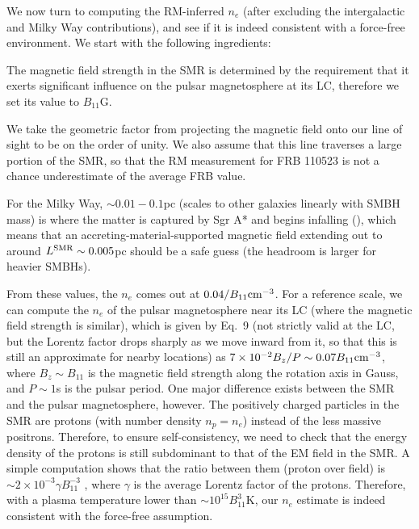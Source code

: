 \documentclass{aa}
\begin{document}
We now turn to computing the RM-inferred $n_e$ (after excluding the intergalactic and Milky Way contributions), and see if it is indeed consistent with a force-free environment. We start with the following ingredients:
\begin{list}{}{\leftmargin=1em}\renewcommand{\labelenumi}{\textbf{\theenumi}.}
\setlength{\leftmargin}{0pt}

\item 
The magnetic field strength in the SMR is determined by the requirement that it exerts significant influence on the pulsar magnetosphere at its LC, therefore we set its value to $B_{11}$G. 

\item We take the geometric factor from projecting the magnetic field onto our line of sight to be on the order of unity.
We also assume that this line traverses a large portion of the SMR, so that the RM measurement for FRB 110523 is not a chance underestimate of the average FRB value. 

\item For the Milky Way, $\sim 0.01-0.1$pc (scales to other galaxies linearly with SMBH mass) is where the matter is captured by Sgr A* and begins infalling (\cite{2013pss5.book..243M,1994ApJ...426..577M,2002ApJ...575..855Q}), which means that an accreting-material-supported magnetic field extending out to around $L^{\rm SMR} \sim 0.005$pc should be a safe guess (the headroom is larger for heavier SMBHs). 
\end{list}
From these values, the $n_e$ comes out at $0.04/B_{11} {\rm cm}^{-3}$. For a reference scale, we can compute the $n_e$ of the pulsar magnetosphere near its LC (where the magnetic field strength is similar), which is given by 
\cite{Goldreich:1969sb} Eq.~9 (not strictly valid at the LC, but the Lorentz factor drops sharply as we move inward from it, so that this is still an approximate for nearby locations) as
$7\times 10^{-2} B_z/P \sim 0.07 B_{11} \rm{cm}^{-3}$, where $B_z \sim B_{11}$ is the magnetic field strength along the rotation axis in Gauss, and $P\sim 1$s is the pulsar period. 
One major difference exists between the SMR and the pulsar magnetosphere,
however. The positively charged particles in the SMR are protons (with number density $n_p=n_e$) instead of the less massive positrons. Therefore, to ensure self-consistency, we need to check that the energy density of the protons is still subdominant to that of the EM field in the SMR. A simple computation shows that the ratio between them (proton over field) is $\sim 2\times 10^{-3}\gamma B_{11}^{-3}$ , where $\gamma$ is the average Lorentz factor of the protons. Therefore, with a plasma temperature lower than $\sim 10^{15}B^3_{11}$K, our $n_e$ estimate is indeed consistent with the force-free assumption.
\end{document}

